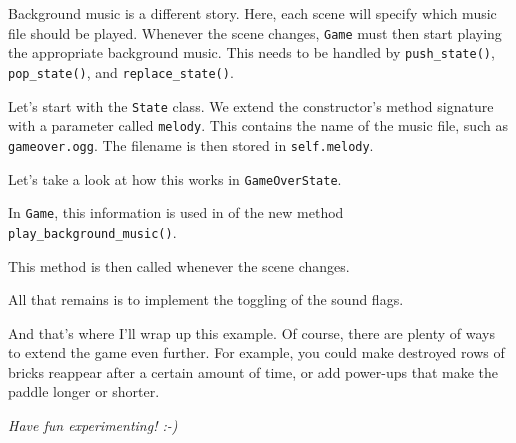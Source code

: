 
Background music is a different story. Here, each scene will specify which music file should be played. Whenever the scene changes, \texttt{Game} must then start playing the appropriate background music. This needs to be handled by \texttt{push\_state()}, \texttt{pop\_state()}, and \texttt{replace\_state()}.

Let's start with the \texttt{State} class. We extend the constructor's method signature with a parameter called \texttt{melody}. This contains the name of the music file, such as \texttt{gameover.ogg}. The filename is then stored in \texttt{self.melody}.


Let's take a look at how this works in \texttt{GameOverState}.


In \texttt{Game}, this information is used in  of the new method \texttt{play\_background\_music()}.


This method is then called whenever the scene changes.


All that remains is to implement the toggling of the sound flags.


And that's where I'll wrap up this example. Of course, there are plenty of ways to extend the game even further. For example, you could make destroyed rows of bricks reappear after a certain amount of time, or add power-ups that make the paddle longer or shorter.

\emph{Have fun experimenting! :-)}
